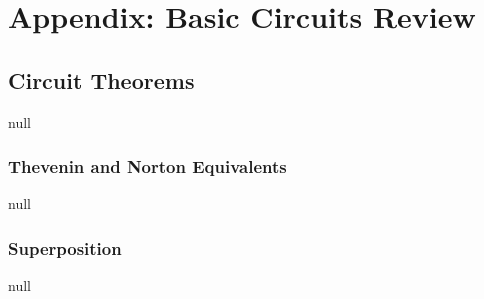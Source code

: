 \chapter{Appendix: Basic Circuits Review}
\section{Circuit Theorems}
null
\subsection{Thevenin and Norton Equivalents}
null
\subsection{Superposition}
null
